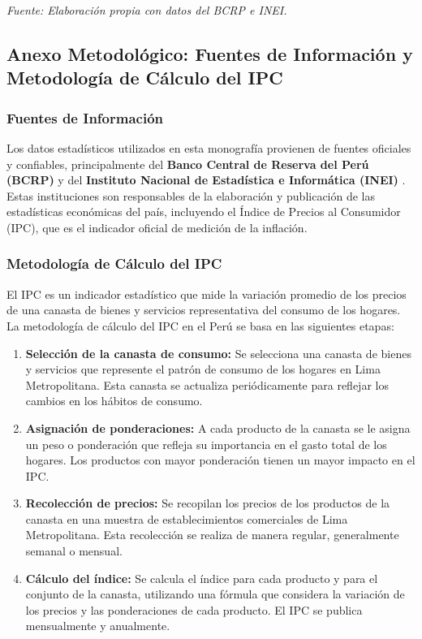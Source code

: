 \documentclass[
  stu,
  floatsintext,
  longtable,
  a4paper,
  nolmodern,
  notxfonts,
  notimes,
  12pt,
  colorlinks=true,linkcolor=blue,citecolor=blue,urlcolor=blue]{apa7}
\providecommand{\tightlist}{%
  \setlength{\itemsep}{0pt}\setlength{\parskip}{0pt}}
\begin{document}
\emph{Fuente: Elaboración propia con datos del BCRP e INEI.}

\subsection{Anexo Metodológico: Fuentes de Información y Metodología de
Cálculo del
IPC}\label{anexo-metodoluxf3gico-fuentes-de-informaciuxf3n-y-metodologuxeda-de-cuxe1lculo-del-ipc}

\subsubsection{Fuentes de Información}\label{fuentes-de-informaciuxf3n}

Los datos estadísticos utilizados en esta monografía provienen de
fuentes oficiales y confiables, principalmente del \textbf{Banco Central
de Reserva del Perú (BCRP)} y del \textbf{Instituto Nacional de
Estadística e Informática (INEI)} . Estas instituciones son responsables
de la elaboración y publicación de las estadísticas económicas del país,
incluyendo el Índice de Precios al Consumidor (IPC), que es el indicador
oficial de medición de la inflación.

\subsubsection{Metodología de Cálculo del
IPC}\label{metodologuxeda-de-cuxe1lculo-del-ipc}

El IPC es un indicador estadístico que mide la variación promedio de los
precios de una canasta de bienes y servicios representativa del consumo
de los hogares. La metodología de cálculo del IPC en el Perú se basa en
las siguientes etapas:

\begin{enumerate}
\def\labelenumi{\arabic{enumi}.}
\tightlist
\item
  \textbf{Selección de la canasta de consumo:} Se selecciona una canasta
  de bienes y servicios que represente el patrón de consumo de los
  hogares en Lima Metropolitana. Esta canasta se actualiza
  periódicamente para reflejar los cambios en los hábitos de consumo.
\item
  \textbf{Asignación de ponderaciones:} A cada producto de la canasta se
  le asigna un peso o ponderación que refleja su importancia en el gasto
  total de los hogares. Los productos con mayor ponderación tienen un
  mayor impacto en el IPC.
\item
  \textbf{Recolección de precios:} Se recopilan los precios de los
  productos de la canasta en una muestra de establecimientos comerciales
  de Lima Metropolitana. Esta recolección se realiza de manera regular,
  generalmente semanal o mensual.
\item
  \textbf{Cálculo del índice:} Se calcula el índice para cada producto y
  para el conjunto de la canasta, utilizando una fórmula que considera
  la variación de los precios y las ponderaciones de cada producto. El
  IPC se publica mensualmente y anualmente.
\end{enumerate}
\end{document}
